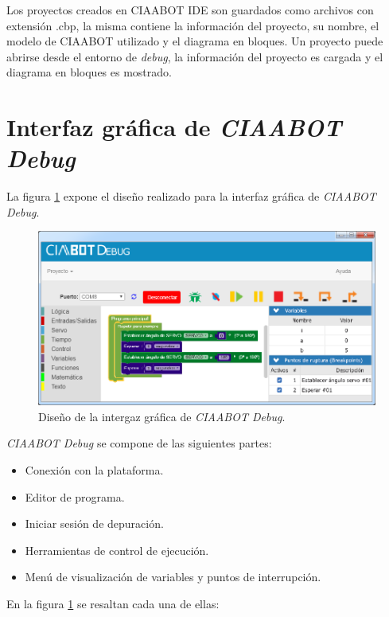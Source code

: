 Los proyectos creados en CIAABOT IDE son guardados como archivos con extensión .cbp, la misma contiene la información del proyecto, su nombre, el modelo de CIAABOT utilizado
y el diagrama en bloques. Un proyecto puede abrirse desde el entorno de \emph{debug}, la información del proyecto es cargada y el diagrama en bloques es mostrado.

\section{Interfaz gráfica de \emph{CIAABOT Debug}}
La figura \ref{fig:debug-modos} expone el diseño realizado para la interfaz gráfica de \emph{CIAABOT Debug}.


\begin{figure}[!htbp]
	\begin{center}  %
		\includegraphics[width=15cm]{./Figures/CIAABOT-DEBUG-GUI-2.png}
		\par\caption{Diseño de la intergaz gráfica de \emph{CIAABOT Debug}.}\label{fig:debug-modos}
	\end{center}
\end{figure}


\emph{CIAABOT Debug} se compone de las siguientes partes:

\begin{itemize}
\item
Conexión con la plataforma.
\item
Editor de programa.	
\item
Iniciar sesión de depuración.
\item
Herramientas de control de ejecución.
\item
Menú de visualización de variables y puntos de interrupción.
\end{itemize}

En la figura \ref{fig:debug-modos} se resaltan cada una de ellas:

